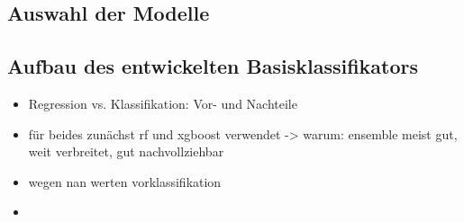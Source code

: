 \subsection{Auswahl der Modelle}

\subsection{Aufbau des entwickelten Basisklassifikators}
\begin{itemize}
	\item Regression vs. Klassifikation: Vor- und Nachteile
	\item für beides zunächst rf und xgboost verwendet -> warum: ensemble meist gut, weit verbreitet, gut nachvollziehbar
	\item wegen nan werten vorklassifikation
	\item 
\end{itemize}





